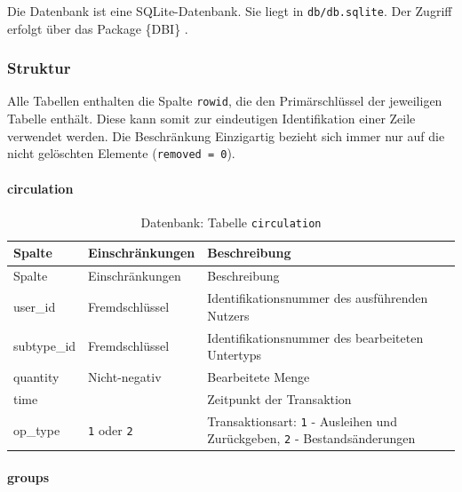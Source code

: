 \documentclass[
]{article}
\begin{document}
Die Datenbank ist eine SQLite-Datenbank. Sie liegt in \texttt{db/db.sqlite}. Der Zugriff erfolgt über das Package \{DBI\} \autocite{R-DBI}.

\hypertarget{struktur}{%
\subsubsection{Struktur}\label{struktur}}

Alle Tabellen enthalten die Spalte \texttt{rowid}, die den Primärschlüssel der jeweiligen Tabelle enthält. Diese kann somit zur eindeutigen Identifikation einer Zeile verwendet werden. Die Beschränkung Einzigartig bezieht sich immer nur auf die nicht gelöschten Elemente (\texttt{removed\ =\ 0}).

\hypertarget{circulation}{%
\paragraph{circulation}\label{circulation}}

\begin{longtable}[]{@{}
  >{\raggedright\arraybackslash}p{}
  >{\raggedright\arraybackslash}p{}
  >{\raggedright\arraybackslash}p{}@{}}
\caption{\label{tab:circulation} Datenbank: Tabelle \texttt{circulation}}\tabularnewline
\toprule
Spalte & Einschränkungen & Beschreibung \\
\midrule
\endfirsthead
\toprule
Spalte & Einschränkungen & Beschreibung \\
\midrule
\endhead
user\_id & Fremdschlüssel & Identifikationsnummer des ausführenden Nutzers \\
subtype\_id & Fremdschlüssel & Identifikationsnummer des bearbeiteten Untertyps \\
quantity & Nicht-negativ & Bearbeitete Menge \\
time & & Zeitpunkt der Transaktion \\
op\_type & \texttt{1} oder \texttt{2} & Transaktionsart: \texttt{1} - Ausleihen und Zurückgeben, \texttt{2} - Bestandsänderungen \\
\bottomrule
\end{longtable}

\hypertarget{groups}{%
\paragraph{groups}\label{groups}}
\end{document}
